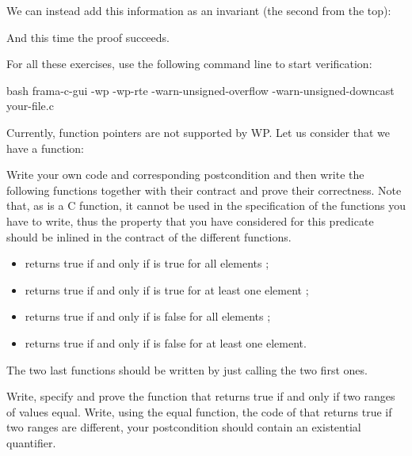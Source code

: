 We can instead add this information as an invariant (the second from
the top):




And this time the proof succeeds.




For all these exercises, use the following command line to start verification:

\begin{CodeBlock}{bash}
frama-c-gui -wp -wp-rte -warn-unsigned-overflow -warn-unsigned-downcast your-file.c
\end{CodeBlock}




Currently, function pointers are not supported by WP. Let us consider that
we have a function:




Write your own code and corresponding postcondition and then write the
following functions together with their contract and prove their correctness.
Note that, as  is a C function, it cannot be used in the
specification of the functions you have to write, thus the property that you
have considered for this predicate should be inlined in the contract of the
different functions.


\begin{itemize}
\item {} returns true if and only if 
  is true for all elements ;
\item {} returns true if and only if 
  is true for at least one element ;
\item {} returns true if and only if 
  is false for all elements ;
\item {} returns true if and only if 
  is false for at least one element.
\end{itemize}


The two last functions should be written by just calling the two first ones.




Write, specify and prove the function  that returns true if
and only if two ranges of values equal. Write, using the equal function, the
code of  that returns true if two ranges are different,
your postcondition should contain an existential quantifier.


